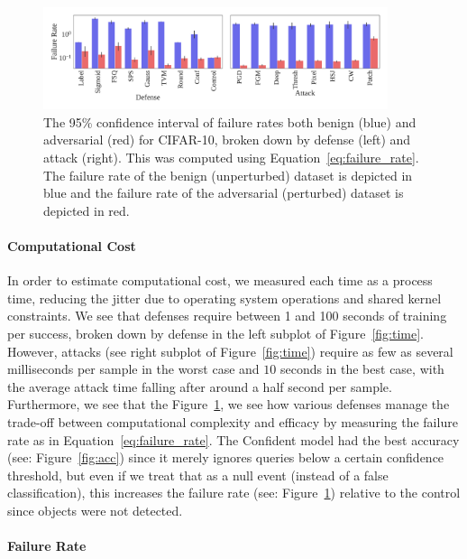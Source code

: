 \documentclass[journal]{IEEEtran}
\begin{document}
\begin{figure}[!hptb]
    {\centering
    \includegraphics[width=0.9\textwidth]{images/cifar-10/failure_rate_plot.pdf}
    \vspace{-1em}
    \caption{The 95\% confidence interval of failure rates both benign (blue) and adversarial (red) for CIFAR-10, broken down by defense (left) and attack (right). This was computed using Equation~\ref{eq:failure_rate}. The failure rate of the benign (unperturbed) dataset is depicted in blue and the failure rate of the adversarial (perturbed) dataset is depicted in red.}
    \label{fig:failure_rate}
    } %
\end{figure}

\paragraph{Computational Cost}

 In order to estimate computational cost, we measured each time as a process time, reducing the jitter due to operating system operations and shared kernel constraints. We see that defenses require between 1 and 100 seconds of training per success, broken down by defense in the left subplot of Figure~\ref{fig:time}. However, attacks (see right subplot of Figure~\ref{fig:time}) require as few as several milliseconds per sample in the worst case and $10$ seconds in the best case, with the average attack time falling after around a half second per sample. Furthermore, we see that the  Figure~\ref{fig:failure_rate}, we see how various defenses manage the trade-off between computational complexity and efficacy by measuring the failure rate as in Equation~\ref{eq:failure_rate}. The Confident model had the best accuracy (see: Figure~\ref{fig:acc}) since it merely ignores queries below a certain confidence threshold, but even if we treat that as a null event (instead of a false classification), this increases the failure rate (see: Figure~\ref{fig:failure_rate}) relative to the control since objects were not detected.
 

\paragraph{Failure Rate}
\end{document}
